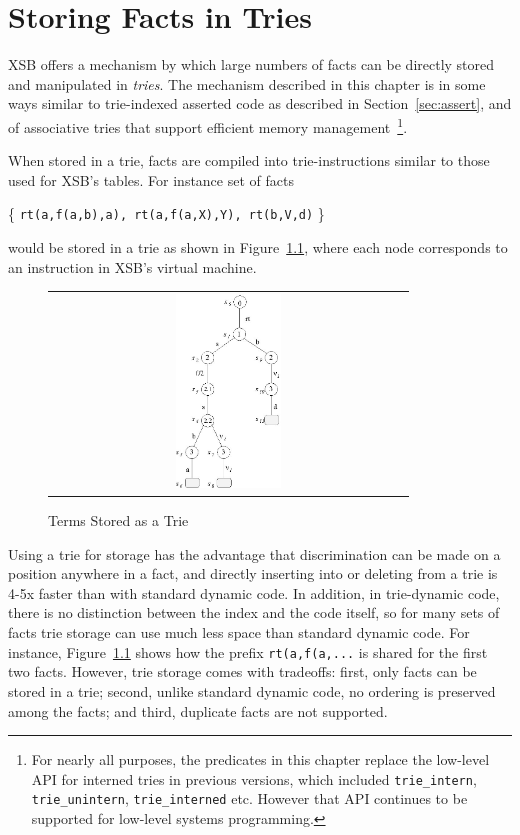 \chapter{Storing Facts in Tries} \label{chap:tries}

XSB offers a mechanism by which large numbers of facts can be directly
stored and manipulated in {\em tries}.
The mechanism described in this chapter is in some ways similar to
trie-indexed asserted code as described in Section~\ref{sec:assert},
and of associative tries that support efficient memory
management~\footnote{For nearly all purposes, the predicates in this
  chapter replace the low-level API for interned tries in previous
  versions, which included {\tt trie\_intern}, {\tt trie\_unintern},
  {\tt trie\_interned} etc.  However that API continues to be
  supported for low-level systems programming.}.

When stored in a trie, facts are compiled into trie-instructions
similar to those used for XSB's tables.  For instance set of facts
\begin{center}
\{ {\tt rt(a,f(a,b),a), rt(a,f(a,X),Y), rt(b,V,d)} \} 
\end{center}
would be stored in a trie as shown in Figure~\ref{fig:trie}, where
each node corresponds to an instruction in XSB's virtual machine.
\begin{figure}[htbp] \label{fig:trie}
\centering
\begin{tabular}{c}
\includegraphics[width=0.3\textwidth]{trie}
\end{tabular}
\caption{Terms Stored as a Trie}
\end{figure} 
Using a trie for storage has the advantage that discrimination can be
made on a position anywhere in a fact, and directly inserting into or
deleting from a trie is 4-5x faster than with standard dynamic code.
In addition, in trie-dynamic code, there is no distinction between the
index and the code itself, so for many sets of facts trie storage can
use much less space than standard dynamic code.  For instance,
Figure~\ref{fig:trie} shows how the prefix {\tt rt(a,f(a,...} is
shared for the first two facts.  However, trie storage comes with
tradeoffs: first, only facts can be stored in a trie; second, unlike
standard dynamic code, no ordering is preserved among the facts; and
third, duplicate facts are not supported.

